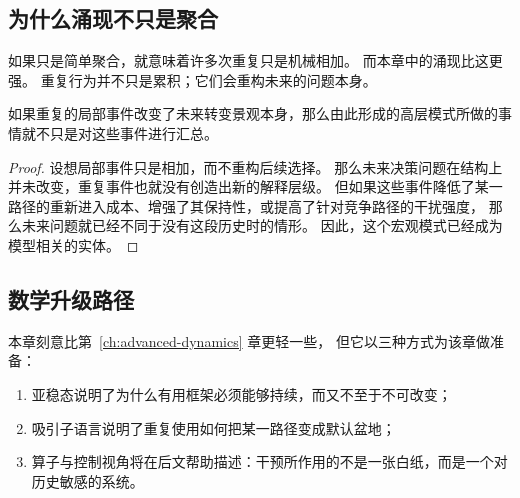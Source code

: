\subsection{为什么涌现不只是聚合}

如果只是简单聚合，就意味着许多次重复只是机械相加。
而本章中的涌现比这更强。
重复行为并不只是累积；它们会重构未来的问题本身。

\begin{lemma}[重构判据]
如果重复的局部事件改变了未来转变景观本身，那么由此形成的高层模式所做的事情就不只是对这些事件进行汇总。
\end{lemma}

\begin{proof}
设想局部事件只是相加，而不重构后续选择。
那么未来决策问题在结构上并未改变，重复事件也就没有创造出新的解释层级。
但如果这些事件降低了某一路径的重新进入成本、增强了其保持性，或提高了针对竞争路径的干扰强度，
那么未来问题就已经不同于没有这段历史时的情形。
因此，这个宏观模式已经成为模型相关的实体。
\end{proof}

\subsection{数学升级路径}

本章刻意比第~\ref{ch:advanced-dynamics} 章更轻一些，
但它以三种方式为该章做准备：
\begin{enumerate}[nosep]
  \item 亚稳态说明了为什么有用框架必须能够持续，而又不至于不可改变；
  \item 吸引子语言说明了重复使用如何把某一路径变成默认盆地；
  \item 算子与控制视角将在后文帮助描述：干预所作用的不是一张白纸，而是一个对历史敏感的系统。
\end{enumerate}